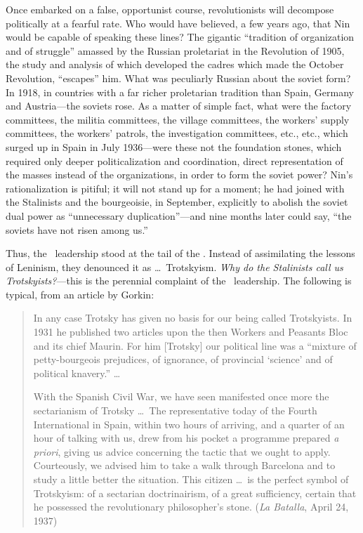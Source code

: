 Once embarked on a false, opportunist course, revolutionists will decompose politically at a fearful rate. Who would have believed, a few years ago, that Nin would be capable of speaking these lines? The gigantic ``tradition of organization and of struggle'' amassed by the Russian proletariat in the Revolution of 1905, the study and analysis of which developed the cadres which made the October Revolution, ``escapes'' him. What was peculiarly Russian about the soviet form? In 1918, in countries with a far richer proletarian tradition than Spain, Germany and Austria---the soviets rose. As a matter of simple fact, what were the factory committees, the militia committees, the village committees, the workers’ supply committees, the workers’ patrols, the investigation committees, etc., etc., which surged up in Spain in July 1936---were these not the foundation stones, which required only deeper politicalization and coordination, direct representation of the masses instead of the organizations, in order to form the soviet power? Nin’s rationalization is pitiful; it will not stand up for a moment; he had joined with the Stalinists and the bourgeoisie, in September, explicitly to abolish the soviet dual power as ``unnecessary duplication''---and nine months later could say, ``the soviets have not risen among us.''

Thus, the \POUM\ leadership stood at the tail of the \CNT. Instead of assimilating the lessons of Leninism, they denounced it as \dots\ Trotskyism. \emph{Why do the Stalinists call us Trotskyists?}---this is the perennial complaint of the \POUM\ leadership. The following is typical, from an article by Gorkin:

\begin{quotation}
  In any case Trotsky has given no basis for our being called Trotskyists. In 1931 he published two articles upon the then Workers and Peasants Bloc and its chief Maurin. For him [Trotsky] our political line was a ``mixture of petty-bourgeois prejudices, of ignorance, of provincial `science' and of political knavery.'' \dots
  
  With the Spanish Civil War, we have seen manifested once more the sectarianism of Trotsky \dots\ The representative today of the Fourth International in Spain, within two hours of arriving, and a quarter of an hour of talking with us, drew from his pocket a programme prepared \emph{a priori}, giving us advice concerning the tactic that we ought to apply. Courteously, we advised him to take a walk through Barcelona and to study a little better the situation. This citizen \dots\ is the perfect symbol of Trotskyism: of a sectarian doctrinairism, of a great sufficiency, certain that he possessed the revolutionary philosopher’s stone. (\emph{La Batalla}, April 24, 1937)
\end{quotation}

